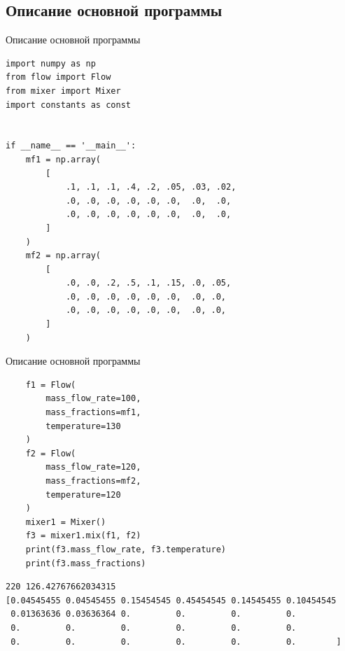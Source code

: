 \documentclass[aspectratio=169, mathserif]{beamer}	%
\begin{document}
\subsection{Описание основной программы}
\begin{frame}[fragile]{Описание основной программы}
\scriptsize
\begin{verbatim}
import numpy as np
from flow import Flow
from mixer import Mixer
import constants as const


if __name__ == '__main__':
    mf1 = np.array(
        [
            .1, .1, .1, .4, .2, .05, .03, .02,
            .0, .0, .0, .0, .0, .0,  .0,  .0,
            .0, .0, .0, .0, .0, .0,  .0,  .0,
        ]
    )
    mf2 = np.array(
        [
            .0, .0, .2, .5, .1, .15, .0, .05,
            .0, .0, .0, .0, .0, .0,  .0, .0,
            .0, .0, .0, .0, .0, .0,  .0, .0,
        ]
    )
\end{verbatim}
\vfill
\end{frame}


\begin{frame}[fragile]{Описание основной программы}
\scriptsize
\begin{verbatim}
    f1 = Flow(
        mass_flow_rate=100,
        mass_fractions=mf1,
        temperature=130
    )
    f2 = Flow(
        mass_flow_rate=120,
        mass_fractions=mf2,
        temperature=120
    )
    mixer1 = Mixer()
    f3 = mixer1.mix(f1, f2)
    print(f3.mass_flow_rate, f3.temperature)
    print(f3.mass_fractions)
\end{verbatim}
\vfill
\begin{verbatim}
220 126.42767662034315
[0.04545455 0.04545455 0.15454545 0.45454545 0.14545455 0.10454545
 0.01363636 0.03636364 0.         0.         0.         0.
 0.         0.         0.         0.         0.         0.
 0.         0.         0.         0.         0.         0.        ]
\end{verbatim}
\vfill
\end{frame}


\end{document}
